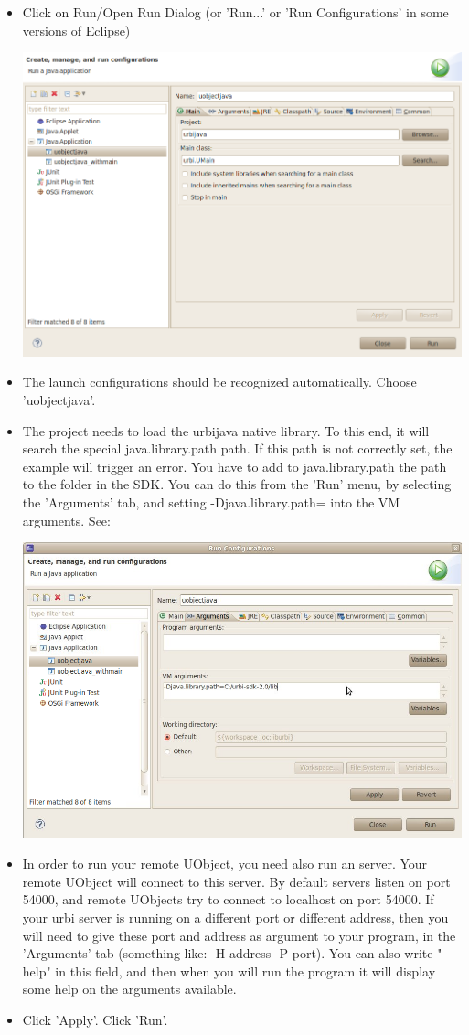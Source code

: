 \begin{itemize}
\item Click on Run/Open Run Dialog (or 'Run...' or 'Run Configurations' in
  some versions of Eclipse)

\begin{center}
  \includegraphics[width=0.6\linewidth]{img/run-uobjectjava}
\end{center}

\item The launch configurations should be recognized automatically. Choose
  'uobjectjava'.

\item The project needs to load the urbijava native library. To this end, it
  will search the special java.library.path path. If this path is not
  correctly set, the example will trigger an error.  You have to add to
  java.library.path the path to the  folder in the \urbi SDK. You
  can do this from the 'Run' menu, by selecting the 'Arguments' tab, and
  setting -Djava.library.path= into the VM
  arguments. See:

\begin{center}
  \includegraphics[width=0.6\linewidth]{img/set_javalibrarypath}
\end{center}

\item In order to run your remote UObject, you need also run an \urbi
  server. Your remote UObject will connect to this \urbi server. By default
  \urbi servers listen on port 54000, and remote UObjects try to connect to
  localhost on port 54000. If your urbi server is running on a different
  port or different address, then you will need to give these port and
  address as argument to your program, in the 'Arguments' tab (something
  like: -H address -P port). You can also write "--help" in this field, and
  then when you will run the program it will display some help on the
  arguments available.

\item Click 'Apply'. Click 'Run'.

\end{itemize}

